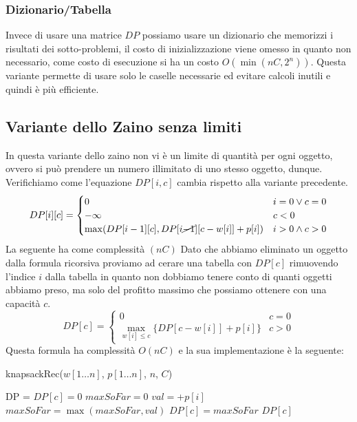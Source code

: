                 \subsubsection{Dizionario/Tabella}
                    Invece di usare una matrice $DP$ possiamo usare un dizionario che memorizzi i risultati dei sotto-problemi, il costo di inizializzazione viene omesso in quanto non necessario, come costo di esecuzione si ha un costo $O(\min(nC, 2^n))$. Questa variante permette di usare solo le caselle necessarie ed evitare calcoli inutili e quindi è più efficiente.
        \subsection{Variante dello Zaino senza limiti}
            In questa variante dello zaino non vi è un limite di quantità per ogni oggetto, ovvero si può prendere un numero illimitato di uno stesso oggetto, dunque. Verifichiamo come l'equazione $DP[i,c]$ cambia rispetto alla variante precedente.
            $$
                DP[i][c]=\begin{cases}
                    0 & i=0\lor c=0 \\
                    -\infty & c<0 \\
                    \max(DP[i-1][c], DP[i\cancel{-1}][c-w[i]]+p[i]) & i>0\land c>0
                \end{cases}
            $$
            La seguente ha come complessità $(nC)$\newline
            Dato che abbiamo eliminato un oggetto dalla formula ricorsiva proviamo ad cerare una tabella con $DP[c]$ rimuovendo l'indice $i$ dalla tabella in quanto non dobbiamo tenere conto di quanti oggetti abbiamo preso, ma solo del profitto massimo che possiamo ottenere con una capacità $c$.
            $$
                DP[c]=\begin{cases}
                    0 & c=0 \\
                    \max_{w[i]\leq c}\{DP[c-w[i]]+p[i]\} & c>0
                \end{cases}
            $$
            Questa formula ha complessità $O(nC)$ e la sua implementazione è la seguente:
            \begin{algorithm}[H]
                \caption{\Int knapsackRec(\Int[] $w[1 \ldots n]$, \Int[] $p[1 \ldots n]$, \Int $n$, \Int $C$)}
                \begin{algorithmic}
                    \State DP = \New \Int[0\dots C]
                        \State $DP[c]=0$
                    \EndFor
                        \State \Int $maxSoFar = 0$ 
                                \State \Int $val = $+$p[i]$
                                \State $maxSoFar = \max(maxSoFar, val)$
                            \EndIf
                        \EndFor
                        \State $DP[c]=maxSoFar$
                    \EndFor
                    \State \Return $DP[c]$
                \end{algorithmic}
            \end{algorithm}
